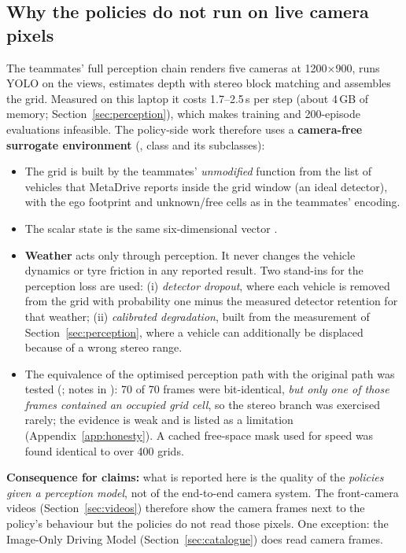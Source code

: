 \subsection{Why the policies do not run on live camera pixels}\label{sec:surrogate}
The teammates' full perception chain renders five cameras at 1200$\times$900, runs YOLO on the views, estimates depth with stereo block matching and assembles the grid. Measured on this laptop it costs 1.7--2.5\,s per step
(about 4\,GB of memory; Section~\ref{sec:perception}), which makes training and 200-episode evaluations infeasible. The policy-side work therefore uses a \textbf{camera-free surrogate environment} (, class  and its subclasses):
\begin{itemize}
\item The grid is built by the teammates' \emph{unmodified} function  from the list of vehicles that MetaDrive reports inside the grid window (an ideal detector), with the ego footprint and unknown/free cells as in the teammates' encoding.
\item The scalar state is the same six-dimensional vector .
\item \textbf{Weather} acts only through perception. It never changes the vehicle dynamics or tyre friction in any reported result. Two stand-ins for the perception loss are used: (i) \emph{detector dropout}, where each vehicle is removed from the grid with probability one minus the measured detector retention
  for that weather; (ii) \emph{calibrated degradation}, built from the measurement of Section~\ref{sec:perception}, where a vehicle can additionally be displaced because of a wrong stereo range.
\item The equivalence of the optimised perception path with the original path was tested (; notes in ): 70 of 70 frames were bit-identical, \emph{but only one of those frames contained an occupied grid cell}, so the stereo branch was exercised rarely; the evidence is weak and is listed as a limitation (Appendix~\ref{app:honesty}).
  A cached free-space mask used for speed was found identical to  over 400 grids.
\end{itemize}
\textbf{Consequence for claims:} what is reported here is the quality of the \emph{policies given a perception model}, not of the end-to-end camera system. The front-camera videos (Section~\ref{sec:videos}) therefore show the camera frames next to the policy's behaviour but the policies do not read those pixels.
One exception: the Image-Only Driving Model (Section~\ref{sec:catalogue}) does read camera frames.

